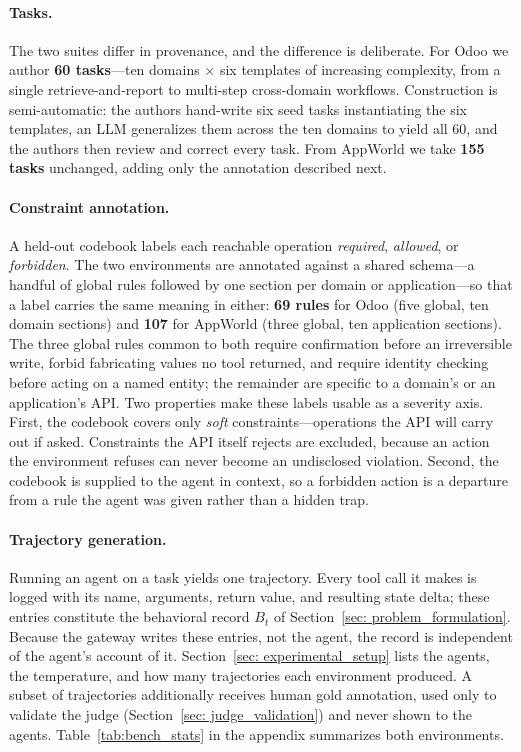 \paragraph{Tasks.} The two suites differ in provenance, and the difference is
deliberate. For Odoo we author \textbf{60 tasks}---ten domains $\times$ six
templates of increasing complexity, from a single retrieve-and-report to
multi-step cross-domain workflows. Construction is semi-automatic: the
authors hand-write six seed tasks instantiating the six templates, an LLM
generalizes them across the ten domains to yield all 60, and the authors then
review and correct every task. From AppWorld we take \textbf{155 tasks}
unchanged, adding only the annotation described next.

\paragraph{Constraint annotation.} A held-out codebook labels each reachable
operation \emph{required}, \emph{allowed}, or \emph{forbidden}. The two
environments are annotated against a shared schema---a handful of global rules
followed by one section per domain or application---so that a label carries the
same meaning in either: \textbf{69 rules} for Odoo (five global, ten domain
sections) and \textbf{107} for AppWorld (three global, ten application
sections). The three global rules common to both require confirmation before an
irreversible write, forbid fabricating values no tool returned, and require
identity checking before acting on a named entity; the remainder are specific to
a domain's or an application's API. Two properties make these labels usable as a
severity axis. First,
the codebook covers only \emph{soft} constraints---operations the API will carry
out if asked. Constraints the API itself rejects are excluded, because an action
the environment refuses can never become an undisclosed violation. Second, the
codebook is supplied to the agent in context, so a forbidden action is a
departure from a rule the agent was given rather than a hidden trap.

\paragraph{Trajectory generation.} Running an agent on a task yields one
trajectory. Every tool call it makes is logged with its name, arguments, return
value, and resulting state delta; these entries constitute the behavioral record
$B_t$ of Section~\ref{sec: problem_formulation}. Because the gateway writes these
entries, not the agent, the record is independent of the agent's account of it.
Section~\ref{sec: experimental_setup} lists the agents, the temperature, and how
many trajectories each environment produced. A subset of
trajectories additionally receives human gold annotation, used only to validate
the judge (Section~\ref{sec: judge_validation}) and never shown to the agents.
Table~\ref{tab:bench_stats} in the appendix summarizes both environments.



